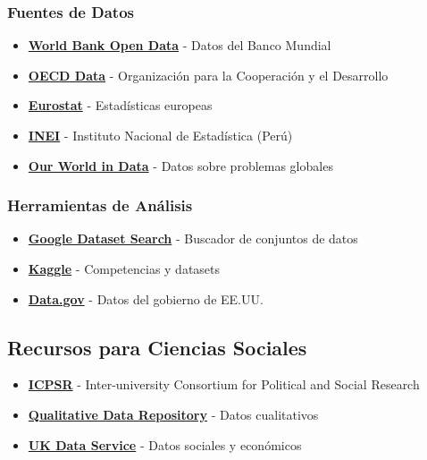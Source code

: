 \documentclass[
  jou,
  floatsintext,
  longtable,
  a4paper,
  nolmodern,
  notxfonts,
  notimes,
  12pt,
  colorlinks=true,linkcolor=blue,citecolor=blue,urlcolor=blue]{apa7}
\providecommand{\tightlist}{%
  \setlength{\itemsep}{0pt}\setlength{\parskip}{0pt}}
\begin{document}
\subsubsection{Fuentes de Datos}\label{fuentes-de-datos}

\begin{itemize}
\tightlist
\item
  \textbf{\href{https://data.worldbank.org/}{World Bank Open Data}} -
  Datos del Banco Mundial
\item
  \textbf{\href{https://data.oecd.org/}{OECD Data}} - Organización para
  la Cooperación y el Desarrollo
\item
  \textbf{\href{https://ec.europa.eu/eurostat}{Eurostat}} - Estadísticas
  europeas
\item
  \textbf{\href{https://www.inei.gob.pe/}{INEI}} - Instituto Nacional de
  Estadística (Perú)
\item
  \textbf{\href{https://ourworldindata.org/}{Our World in Data}} - Datos
  sobre problemas globales
\end{itemize}

\subsubsection{Herramientas de
Análisis}\label{herramientas-de-anuxe1lisis}

\begin{itemize}
\tightlist
\item
  \textbf{\href{https://datasetsearch.research.google.com/}{Google
  Dataset Search}} - Buscador de conjuntos de datos
\item
  \textbf{\href{https://www.kaggle.com/}{Kaggle}} - Competencias y
  datasets
\item
  \textbf{\href{https://data.gov/}{Data.gov}} - Datos del gobierno de
  EE.UU.
\end{itemize}

\subsection{Recursos para Ciencias
Sociales}\label{recursos-para-ciencias-sociales}

\begin{itemize}
\tightlist
\item
  \textbf{\href{https://www.icpsr.umich.edu/}{ICPSR}} - Inter-university
  Consortium for Political and Social Research
\item
  \textbf{\href{https://qdr.syr.edu/}{Qualitative Data Repository}} -
  Datos cualitativos
\item
  \textbf{\href{https://ukdataservice.ac.uk/}{UK Data Service}} - Datos
  sociales y económicos
\end{itemize}
\end{document}
